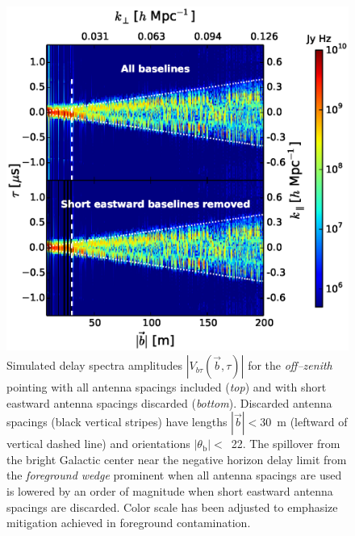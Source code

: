 \documentclass[preprint2,iop,numberedappendix]{emulateapj}
\begin{document}
\begin{figure}[htb]
\centering
\includegraphics[width=\linewidth]{figures/v1_0/baseline_screening_before_after_nside_64_Tsys_95.0K.eps}
\caption{Simulated delay spectra amplitudes $|V_{b\tau}(\vec{b},\tau)|$ for the {\it off--zenith} pointing with all antenna spacings included ({\it top}) and with short eastward antenna spacings discarded ({\it bottom}). Discarded antenna spacings (black vertical stripes) have lengths $|\vec{b}|<30$~m (leftward of vertical dashed line) and orientations $|\theta_\textrm{b}|<$~22. The spillover from the bright Galactic center near the negative horizon delay limit from the {\it foreground wedge} prominent when all antenna spacings are used is lowered by an order of magnitude when short eastward antenna spacings are discarded. Color scale has been adjusted to emphasize mitigation achieved in foreground contamination. \label{fig:before-after}}
\end{figure}
\end{document}
